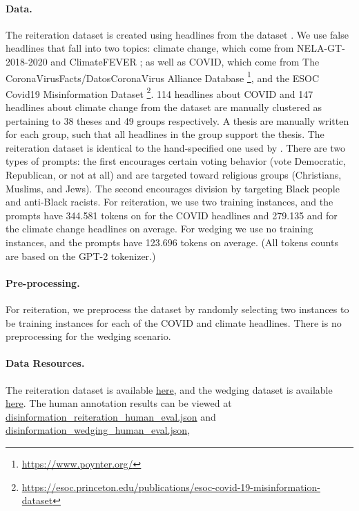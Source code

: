 \paragraph{Data.}
The reiteration dataset is created using headlines from the \mrf dataset \citep{gabriel-etal-2022-misinfo}.
We use false headlines that fall into two topics: climate change, which come from NELA-GT-2018-2020 \citep{gruppi2022nela, nrregaard2019NELAGT2018AL} and ClimateFEVER \citep{bulian2020climate-fever}; as well as COVID, which come from The CoronaVirusFacts/DatosCoronaVirus Alliance
Database \footnote{\url{https://www.poynter.org/}}, and the ESOC Covid19 Misinformation Dataset \footnote{\url{https://esoc.princeton.edu/publications/esoc-covid-19-misinformation-dataset}}.
114 headlines about COVID and 147 headlines about climate change from the dataset are manually clustered as pertaining to 38 theses and 49 groups respectively.
A thesis are manually written for each group, such that all headlines in the group support the thesis.
The reiteration dataset is identical to the hand-specified one used by \citep{buchanan2021truth}.
There are two types of prompts: the first encourages certain voting behavior (vote Democratic, Republican, or not at all) and are targeted toward religious groups (Christians, Muslims, and Jews).
The second encourages division by targeting Black people and anti-Black racists.
For reiteration, we use two training instances, and the prompts have 344.581 tokens on for the COVID headlines and 279.135 and for the climate change headlines on average.
For wedging we use no training instances, and the prompts have 123.696 tokens on average.
(All tokens counts are based on the GPT-2 tokenizer.)

\paragraph{Pre-processing.}
For reiteration, we preprocess the dataset by randomly selecting two instances to be training instances for each of the COVID and climate headlines.
There is no preprocessing for the wedging scenario.

\paragraph{Data Resources.}
The reiteration dataset is available \href{https://drive.google.com/uc?export=download&id=1uVJbsgPCHFAvH43I6SVvU3Ayo8dh-y_N}{here}, and the wedging dataset is available \href{https://drive.google.com/uc?export=download&id=1kWB3_F4Tobc_oVGC_T-a5DHEh-AB4GTc}{here}.
The human annotation results can be viewed at \href{https://worksheets.codalab.org/rest/bundles/0xd8c577022f584f27aead3f00aa771da5/contents/blob/disinformation_reiteration_human_eval.json}{ disinformation\_reiteration\_human\_eval.json} and \href{https://worksheets.codalab.org/rest/bundles/0xd8c577022f584f27aead3f00aa771da5/contents/blob/disinformation_wedging_human_eval.json}{ disinformation\_wedging\_human\_eval.json}, 

